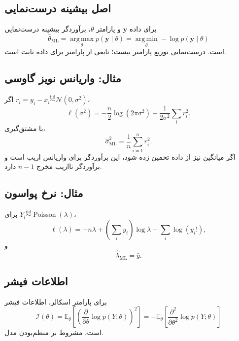\documentclass[12pt,openany,oneside]{book}
\newcommand{\E}{\mathbb{E}}
\newcommand{\vect}[1]{\bm{#1}}
\newcommand{\argmin}{\operatorname*{arg\,min}}
\newcommand{\argmax}{\operatorname*{arg\,max}}
\newcommand{\iid}{\overset{\mathrm{iid}}{\sim}}
\newcommand{\Normal}{\mathcal{N}}
\newcommand{\Poisson}{\operatorname{Poisson}}
\newcommand{\Fisher}{\mathcal{I}}
\begin{document}
\subsection{اصل بیشینه درست‌نمایی}

برای داده \(\vect{y}\) و پارامتر \(\theta\)، برآوردگر بیشینه درست‌نمایی
\begin{equation}
\widehat\theta_{\mathrm{ML}}
=\argmax_{\theta}p(\vect{y}\mid\theta)
=\argmin_{\theta}-\log p(\vect{y}\mid\theta)
\end{equation}
است. درست‌نمایی توزیع پارامتر نیست؛ تابعی از پارامتر برای داده ثابت است.

\subsection{مثال: واریانس نویز گاوسی}

اگر \(r_i=y_i-x_i\iid\Normal(0,\sigma^2)\)،
\begin{equation}
\ell(\sigma^2)
=-\frac{n}{2}\log(2\pi\sigma^2)-\frac{1}{2\sigma^2}\sum_i r_i^2.
\end{equation}
با مشتق‌گیری،
\begin{equation}
\widehat\sigma^2_{\mathrm{ML}}=\frac1n\sum_{i=1}^{n}r_i^2.
\end{equation}
اگر میانگین نیز از داده تخمین زده شود، این برآوردگر برای واریانس اریب است و برآوردگر نااریب مخرج \(n-1\) دارد.

\subsection{مثال: نرخ پواسون}

برای \(Y_i\iid\Poisson(\lambda)\)،
\begin{equation}
\ell(\lambda)=-n\lambda+\left(\sum_i y_i\right)\log\lambda-\sum_i\log(y_i!),
\end{equation}
و
\begin{equation}
\widehat\lambda_{\mathrm{ML}}=\bar y.
\end{equation}

\subsection{اطلاعات فیشر}

برای پارامتر اسکالر، اطلاعات فیشر
\begin{equation}
\Fisher(\theta)
=
\E_\theta\left[
\left(\frac{\partial}{\partial\theta}\log p(Y;\theta)\right)^2
\right]
=
-\E_\theta\left[
\frac{\partial^2}{\partial\theta^2}\log p(Y;\theta)
\right]
\end{equation}
است، مشروط بر منظم‌بودن مدل.
\end{document}
